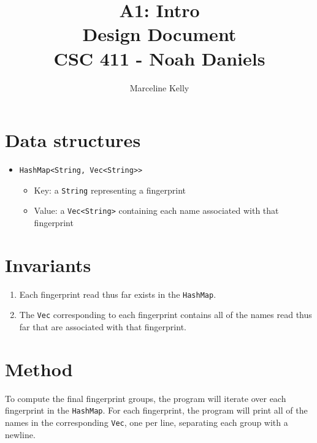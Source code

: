 \documentclass[12pt, letterpaper]{article}
\title{A1: Intro \\
    \large Design Document \\
    CSC 411 - Noah Daniels}
\author{Marceline Kelly}
\date{}
\begin{document}
\maketitle

\section{Data structures}
\begin{itemize}
    \item \verb|HashMap<String, Vec<String>>|
    \begin{itemize}
        \item Key: a \verb|String| representing a fingerprint
        \item Value: a \verb|Vec<String>| containing each name associated with that fingerprint
    \end{itemize}
\end{itemize}

\section{Invariants}
\begin{enumerate}
    \item Each fingerprint read thus far exists in the \verb|HashMap|.
    \item The \verb|Vec| corresponding to each fingerprint contains all of the names read thus far that are associated with that fingerprint.
\end{enumerate}

\section{Method}
To compute the final fingerprint groups, the program will iterate over each fingerprint in the \verb|HashMap|. For each fingerprint, the program will print all of the names in the corresponding \verb|Vec|, one per line, separating each group with a newline.
\end{document}
